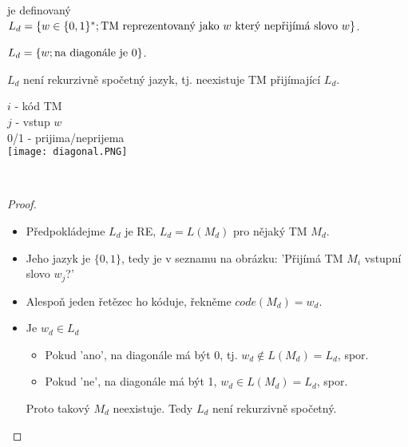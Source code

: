     \begin{frame}%
    \vskip-0.2cm
    \begin{definition}
     je definovaný $L_d=\{w\in \{0,1\}^*; \hbox{TM reprezentovaný jako } w \hbox{ který nepřijímá slovo }w\}$.
    \end{definition}
    \begin{minipage}{0.35\textwidth}
    $L_d=\{w; \hbox{na diagonále je } 0\}$.
    \begin{theorem}
    $L_d$ není rekurzivně spočetný jazyk, tj. neexistuje TM přijímající $L_d$.
    \end{theorem}
    $i$ - k\'od TM\\
    $j$ - vstup $w$\\
    0/1 - prijima/neprijema\\
    \texttt{[image: diagonal.PNG]}
    \end{minipage}
    \begin{minipage}{0.03\textwidth}
    \ \end{minipage}
    \begin{minipage}{0.6\textwidth}
    \begin{proof}
    \begin{itemize}%
        \item Předpokládejme $L_d$ je RE, $L_d=L(M_d)$ pro nějaký TM $M_d$.
        \item Jeho jazyk je $\{0,1\}$, tedy je v seznamu na obrázku: 'Přijímá TM $M_i$ vstupní slovo $w_j$?'
        \item Alespoň jeden řetězec ho kóduje, řekněme $code(M_d)=w_d$.
        \item Je $w_d\in L_d$
        
        \begin{itemize}
            \item Pokud 'ano', na diagonále má být 0, tj. $w_d\notin L(M_d)=L_d$, spor.
    \item Pokud 'ne', na diagonále má být 1, $w_d\in L(M_d)=L_d$, spor.
        \end{itemize}
        Proto takový $M_d$ neexistuje. Tedy $L_d$ není rekurzivně spočetný.
    \end{itemize}
    \end{proof}
    \end{minipage}
    \end{frame}
